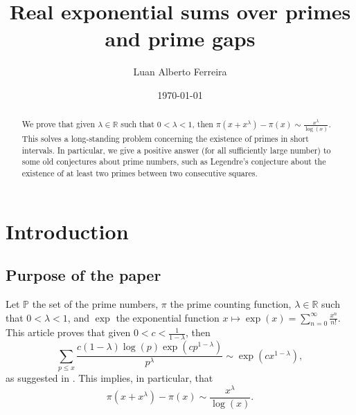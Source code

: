 \documentclass[11pt]{amsart}
\numberwithin{equation}{section}
\newcommand{\R}{\mathbb{R}}
\newcommand{\disum}{\displaystyle \sum}
\newcommand{\difrac}{\displaystyle \frac}
\begin{document}
\title{Real exponential sums over primes and prime gaps}

\author{Luan Alberto Ferreira}

\address{IFSP, \textit{campus} Itaquaquecetuba. Rua Primeiro de Maio, 500, Itaquaquecetuba - SP, Brazil. 08571-050.}

\address{IME - USP. Rua do Mat\~ao, 1010, S\~ao paulo - SP, Brazil. 05508-090.}


\begin{abstract}

We prove that given $\lambda \in \R$ such that $0 < \lambda < 1$, then $\pi(x + x^\lambda) - \pi(x) \sim \displaystyle \frac{x^\lambda}{\log(x)}$. This solves a long-standing problem concerning the existence of primes in short intervals. In particular, we give a positive answer (for all sufficiently large number) to some old conjectures about prime numbers, such as Legendre's conjecture about the existence of at least two primes between two consecutive squares.

\end{abstract}

\date{\today}

\maketitle





\section{Introduction}

\subsection{Purpose of the paper}

Let $\mathbb{P}$ the set of the prime numbers, $\pi$ the prime counting function, $\lambda \in \R$ such that $0 < \lambda < 1$, and $\exp$ the exponential function $x \mapsto \exp(x) = \disum_{n = 0}^{\infty} \difrac{x^n}{n!}$. This article proves that given $0 < c < \difrac{1}{1 - \lambda}$, then \begin{equation} \label{eq1.1} \sum_{p \leq x} \difrac{c(1 - \lambda)\log(p)\exp(cp^{1 - \lambda})}{p^{\lambda}} \sim \exp(cx^{1 - \lambda}),\end{equation} as suggested in \cite{RS}. This implies, in particular, that \begin{equation} \label{eq1.2} \pi(x + x^\lambda) - \pi(x) \sim \frac{x^\lambda}{\log(x)}. \end{equation}
\end{document}

